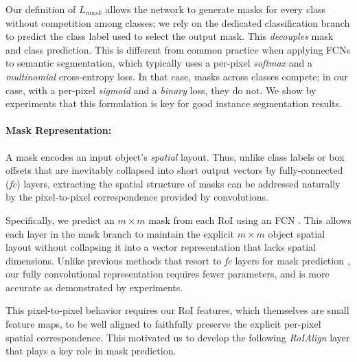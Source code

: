 \documentclass[10pt,twocolumn,letterpaper]{article}
\def\x{\times}
\begin{document}
Our definition of $L_{mask}$ allows the network to generate masks for every class without competition among classes; we rely on the dedicated classification branch to predict the class label used to select the output mask. This \emph{decouples} mask and class prediction. This is different from common practice when applying FCNs \cite{Long2015} to semantic segmentation, which typically uses a per-pixel \emph{softmax} and a \emph{multinomial} cross-entropy loss. In that case, masks across classes compete; in our case, with a per-pixel \emph{sigmoid} and a \emph{binary} loss, they do not. We show by experiments that this formulation is key for good instance segmentation results.

\paragraph{Mask Representation:} A mask encodes an input object's \emph{spatial} layout. Thus, unlike class labels or box offsets that are inevitably collapsed into short output vectors by fully-connected (\emph{fc}) layers, extracting the spatial structure of masks can be addressed naturally by the pixel-to-pixel correspondence provided by convolutions.

Specifically, we predict an $m \x m$ mask from each RoI using an FCN \cite{Long2015}. This allows each layer in the mask branch to maintain the explicit $m \x m$ object spatial layout without collapsing it into a vector representation that lacks spatial dimensions. Unlike previous methods that resort to \emph{fc} layers for mask prediction \cite{Pinheiro2015, Pinheiro2016, Dai2016}, our fully convolutional representation requires fewer parameters, and is more accurate as demonstrated by experiments.

This pixel-to-pixel behavior requires our RoI features, which themselves are small feature maps, to be well aligned to faithfully preserve the explicit per-pixel spatial correspondence. This motivated us to develop the following \emph{RoIAlign} layer that plays a key role in mask prediction.
\end{document}
